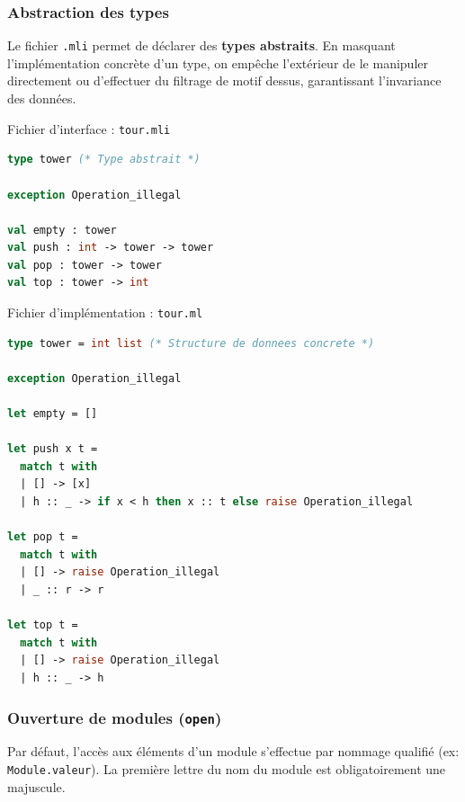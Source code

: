 \documentclass{article}
\begin{document}
\subsubsection{Abstraction des types}
Le fichier \texttt{.mli} permet de déclarer des \textbf{types abstraits}. En masquant l'implémentation concrète d'un type, on empêche l'extérieur de le manipuler directement ou d'effectuer du filtrage de motif dessus, garantissant l'invariance des données.


Fichier d'interface : \texttt{tour.mli}
\begin{lstlisting}[language=Caml]
type tower (* Type abstrait *)

exception Operation_illegal

val empty : tower
val push : int -> tower -> tower
val pop : tower -> tower
val top : tower -> int
\end{lstlisting}

Fichier d'implémentation : \texttt{tour.ml}
\begin{lstlisting}[language=Caml]
type tower = int list (* Structure de donnees concrete *)

exception Operation_illegal

let empty = []

let push x t = 
  match t with
  | [] -> [x]
  | h :: _ -> if x < h then x :: t else raise Operation_illegal

let pop t = 
  match t with
  | [] -> raise Operation_illegal
  | _ :: r -> r

let top t = 
  match t with
  | [] -> raise Operation_illegal
  | h :: _ -> h
\end{lstlisting}


\subsubsection{Ouverture de modules (\texttt{open})}
Par défaut, l'accès aux éléments d'un module s'effectue par nommage qualifié (ex: \texttt{Module.valeur}). La première lettre du nom du module est obligatoirement une majuscule.
\end{document}
